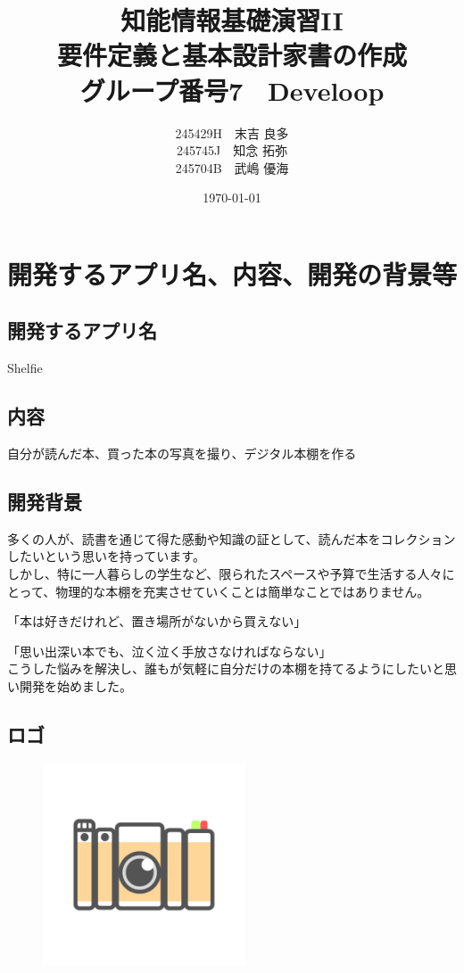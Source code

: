 \documentclass[a4paper, 11pt, titlepage]{jsarticle}
\title{知能情報基礎演習II \\ 要件定義と基本設計家書の作成 \\ グループ番号7　Develoop}
\author{245429H　末吉 良多 \\ 245745J　知念 拓弥 \\ 245704B　武嶋 優海}
\date{\today}
\begin{document}
\maketitle

\clearpage

\tableofcontents
\clearpage
\section{開発するアプリ名、内容、開発の背景等}
\subsection{開発するアプリ名}
Shelfie
\subsection{内容}
自分が読んだ本、買った本の写真を撮り、デジタル本棚を作る
\subsection{開発背景}
多くの人が、読書を通じて得た感動や知識の証として、読んだ本をコレクションしたいという思いを持っています。\\
しかし、特に一人暮らしの学生など、限られたスペースや予算で生活する人々にとって、物理的な本棚を充実させていくことは簡単なことではありません。

「本は好きだけれど、置き場所がないから買えない」

「思い出深い本でも、泣く泣く手放さなければならない」\\
こうした悩みを解決し、誰もが気軽に自分だけの本棚を持てるようにしたいと思い開発を始めました。

\clearpage

\subsection{ロゴ}
\begin{figure}[htbp]
\centering
\includegraphics[width=60mm] {shelfie_logo.png}
\label{fig:func}
\end{figure}
\end{document}
